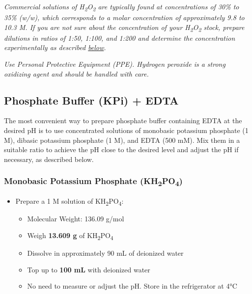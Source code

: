 \documentclass[
  9pt,
  american,
  a5paper,
  extrafontsizes,onecolumn,openright
  ]{memoir}
\providecommand{\tightlist}{%
  \setlength{\itemsep}{0pt}\setlength{\parskip}{0pt}}
\begin{document}
\begin{greybox}[frametitle = Notes]
\emph{Commercial solutions of H\textsubscript{2}O\textsubscript{2} are typically found at concentrations of 30\% to 35\% (w/w), which corresponds to a molar concentration of approximately 9.8 to 10.3 M. If you are not sure about the concentration of your H\textsubscript{2}O\textsubscript{2} stock, prepare dilutions in ratios of 1:50, 1:100, and 1:200 and determine the concentration experimentally as described \hyperref[checking_h2o2]{below}.}

\end{greybox}

\begin{greybox}[frametitle = CAUTION]
\emph{Use Personal Protective Equipment (PPE). Hydrogen peroxide is a strong oxidizing agent and should be handled with care.}

\end{greybox}

\subsection{Phosphate Buffer (KPi) + EDTA}\label{phosphate-buffer-kpi-edta}

The most convenient way to prepare phosphate buffer containing EDTA at the desired pH is to use concentrated solutions of monobasic potassium phosphate (1 M), dibasic potassium phosphate (1 M), and EDTA (500 mM). Mix them in a suitable ratio to achieve the pH close to the desired level and adjust the pH if necessary, as described below.

\subsubsection{\texorpdfstring{Monobasic Potassium Phosphate (KH\textsubscript{2}PO\textsubscript{4})}{Monobasic Potassium Phosphate (KH2PO4)}}\label{monobasic-potassium-phosphate-kh2po4}

\begin{itemize}
\tightlist
\item
  Prepare a 1 M solution of KH\textsubscript{2}PO\textsubscript{4}:

  \begin{itemize}
  \tightlist
  \item
    Molecular Weight: 136.09 g/mol
  \item
    Weigh \textbf{13.609 g} of KH\textsubscript{2}PO\textsubscript{4}
  \item
    Dissolve in approximately 90 mL of deionized water
  \item
    Top up to \textbf{100 mL} with deionized water
  \item
    No need to measure or adjust the pH. Store in the refrigerator at 4°C
  \end{itemize}
\end{itemize}
\end{document}
